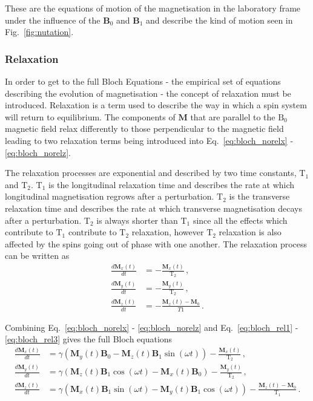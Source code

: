 These are the equations of motion of the magnetisation in the laboratory frame under the influence of the $\mathbf{B}_0$ and $\mathbf{B}_1$ and describe the kind of motion seen in Fig.\ \ref{fig:nutation}. 

\subsubsection{Relaxation}
In order to get to the full Bloch Equations - the empirical set of equations describing the evolution of magnetisation - the concept of relaxation must be introduced. 
Relaxation is a term used to describe the way in which a spin system will return to equilibrium. The components of $\mathbf{M}$ that are parallel to the $\mathrm{B_0}$ magnetic field relax differently to those perpendicular to the magnetic field leading to two relaxation terms being introduced into Eq.\ \ref{eq:bloch_norelx} -\ref{eq:bloch_norelz}. 


The relaxation processes are exponential and described by two time constants, $\mathrm{T}_1$ and $\mathrm{T}_2$. $\mathrm{T}_1$ is the longitudinal relaxation time and describes the rate at which longitudinal magnetisation regrows after a perturbation. 
$\mathrm{T}_2$ is the transverse relaxation time and describes the rate at which transverse magnetisation decays after a perturbation. 
$\mathrm{T}_2$ is always shorter than $\mathrm{T}_1$ since all the effects which contribute to $\mathrm{T}_1$ contribute to $\mathrm{T}_2$ relaxation, however $\mathrm{T}_2$ relaxation is also affected by the spins going out of phase with one another.
The relaxation process can be written as \cite{DeGraaf2007}
\begin{align}
	\frac{d\mathbf{M}_x(t)}{dt} &= -\frac{\mathbf{M}_x(t)}{\mathrm{T}_2}\,,\label{eq:bloch_rel1}\\
	\frac{d\mathbf{M}_y(t)}{dt} &= -\frac{\mathbf{M}_y(t)}{\mathrm{T}_2}\,,\label{eq:bloch_rel2}\\
	\frac{d\mathbf{M}_z(t)}{dt} &= -\frac{\mathbf{M}_z(t) - \mathbf{M}_0}{T1}\,.\label{eq:bloch_rel3}
\end{align}
		
Combining Eq.\ \ref{eq:bloch_norelx} - \ref{eq:bloch_norelz} and Eq.\ \ref{eq:bloch_rel1} - \ref{eq:bloch_rel3} gives the full Bloch equations
\begin{align}
	\frac{d\mathbf{M}_x(t)}{dt} &= \gamma\left(\mathbf{M}_y(t)\mathbf{B}_0 - \mathbf{M}_z(t)\mathbf{B}_1\sin(\omega t)\right) - \frac{\mathbf{M}_x(t)}{\mathrm{T}_2}\,,\label{eq:bloch_labx}\\
	\frac{d\mathbf{M}_y(t)}{dt} &= \gamma\left(\mathbf{M}_z(t)\mathbf{B}_1\cos(\omega t) - \mathbf{M}_x(t)\mathbf{B}_0\right) - \frac{\mathbf{M}_y(t)}{\mathrm{T}_2}\,,\label{eq:bloch_laby}\\
	\frac{d\mathbf{M}_z(t)}{dt} &= \gamma \left(\mathbf{M}_x(t)\mathbf{B}_1\sin(\omega t) - \mathbf{M}_y(t)\mathbf{B}_1\cos(\omega t) \right) - \frac{\mathbf{M}_z(t) - \mathbf{M}_0}{\mathrm{T}_1}\,. \label{eq:bloch_labz}
\end{align}

